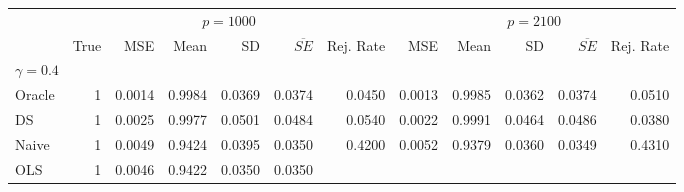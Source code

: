 \begin{tabular}{llllllllllll}
\cline{1-12}
\multicolumn{1}{c}{} &
  \multicolumn{6}{|c}{$ p = 1000 $} &
  \multicolumn{5}{c}{$ p = 2100 $} \\
\multicolumn{1}{c}{} &
  \multicolumn{1}{|r}{True} &
  \multicolumn{1}{r}{MSE} &
  \multicolumn{1}{r}{Mean} &
  \multicolumn{1}{r}{SD} &
  \multicolumn{1}{r}{$\overline{SE}$} &
  \multicolumn{1}{r}{Rej. Rate} &
  \multicolumn{1}{r}{MSE} &
  \multicolumn{1}{r}{Mean} &
  \multicolumn{1}{r}{SD} &
  \multicolumn{1}{r}{$\overline{SE}$} &
  \multicolumn{1}{r}{Rej. Rate} \\
\cline{1-12}
\multicolumn{1}{l}{$\gamma = 0.4$} &
  \multicolumn{1}{|r}{} &
  \multicolumn{1}{r}{} &
  \multicolumn{1}{r}{} &
  \multicolumn{1}{r}{} &
  \multicolumn{1}{r}{} &
  \multicolumn{1}{r}{} &
  \multicolumn{1}{r}{} &
  \multicolumn{1}{r}{} &
  \multicolumn{1}{r}{} &
  \multicolumn{1}{r}{} &
  \multicolumn{1}{r}{} \\
\multicolumn{1}{l}{\hspace{1em}Oracle} &
  \multicolumn{1}{|r}{1} &
  \multicolumn{1}{r}{0.0014} &
  \multicolumn{1}{r}{0.9984} &
  \multicolumn{1}{r}{0.0369} &
  \multicolumn{1}{r}{0.0374} &
  \multicolumn{1}{r}{0.0450} &
  \multicolumn{1}{r}{0.0013} &
  \multicolumn{1}{r}{0.9985} &
  \multicolumn{1}{r}{0.0362} &
  \multicolumn{1}{r}{0.0374} &
  \multicolumn{1}{r}{0.0510} \\
\multicolumn{1}{l}{\hspace{1em}DS} &
  \multicolumn{1}{|r}{1} &
  \multicolumn{1}{r}{0.0025} &
  \multicolumn{1}{r}{0.9977} &
  \multicolumn{1}{r}{0.0501} &
  \multicolumn{1}{r}{0.0484} &
  \multicolumn{1}{r}{0.0540} &
  \multicolumn{1}{r}{0.0022} &
  \multicolumn{1}{r}{0.9991} &
  \multicolumn{1}{r}{0.0464} &
  \multicolumn{1}{r}{0.0486} &
  \multicolumn{1}{r}{0.0380} \\
\multicolumn{1}{l}{\hspace{1em}Naive} &
  \multicolumn{1}{|r}{1} &
  \multicolumn{1}{r}{0.0049} &
  \multicolumn{1}{r}{0.9424} &
  \multicolumn{1}{r}{0.0395} &
  \multicolumn{1}{r}{0.0350} &
  \multicolumn{1}{r}{0.4200} &
  \multicolumn{1}{r}{0.0052} &
  \multicolumn{1}{r}{0.9379} &
  \multicolumn{1}{r}{0.0360} &
  \multicolumn{1}{r}{0.0349} &
  \multicolumn{1}{r}{0.4310} \\
\multicolumn{1}{l}{\hspace{1em}OLS} &
  \multicolumn{1}{|r}{1} &
  \multicolumn{1}{r}{0.0046} &
  \multicolumn{1}{r}{0.9422} &
  \multicolumn{1}{r}{0.0350} &
  \multicolumn{1}{r}{0.0350} &

\end{tabular}
